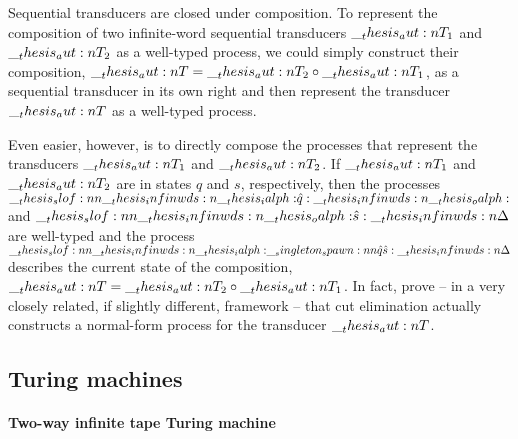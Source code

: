 Sequential transducers are closed under composition.
To represent the composition of two infinite-word sequential transducers $\__thesis_aut:n {T}_1$ and $\__thesis_aut:n {T}_2$ as a well-typed process, we could simply construct their composition, $\__thesis_aut:n {T} = \__thesis_aut:n {T}_2 \circ \__thesis_aut:n {T}_1$, as a sequential transducer in its own right and then represent the transducer $\__thesis_aut:n {T}$ as a well-typed process.

Even easier, however, is to directly compose the processes that represent the transducers $\__thesis_aut:n {T}_1$ and $\__thesis_aut:n {T}_2$.
If $\__thesis_aut:n {T}_1$ and $\__thesis_aut:n {T}_2$ are in states $q$ and $s$, respectively, then the processes $\slof{\infinwds{\ialph} |- \defp{q} : \infinwds{\oalph}}$ and $\slof{\infinwds{\oalph} |- \defp{s} : \infinwds{\Delta}}$ are well-typed and the process $\slof{\infinwds{\ialph} |- \spawn{\defp{q}}{\defp{s}} : \infinwds{\Delta}}$  describes the current state of the composition, $\__thesis_aut:n {T} = \__thesis_aut:n {T}_2 \circ \__thesis_aut:n {T}_1$.
In fact,  prove -- in a very closely related, if slightly different, framework -- that cut elimination actually constructs a normal-form process for the transducer $\__thesis_aut:n {T}$.

\subsection{Turing machines}\label{sec:process-chains:turing-machines}

\paragraph*{Two-way infinite tape Turing machine}

